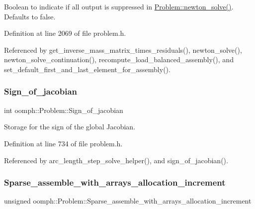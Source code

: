 Boolean to indicate if all output is suppressed in \hyperlink{classoomph_1_1Problem_a62a989ae9a9169b9d905f844db59787f}{Problem\+::newton\+\_\+solve()}. Defaults to false. 



Definition at line 2069 of file problem.\+h.



Referenced by get\+\_\+inverse\+\_\+mass\+\_\+matrix\+\_\+times\+\_\+residuals(), newton\+\_\+solve(), newton\+\_\+solve\+\_\+continuation(), recompute\+\_\+load\+\_\+balanced\+\_\+assembly(), and set\+\_\+default\+\_\+first\+\_\+and\+\_\+last\+\_\+element\+\_\+for\+\_\+assembly().

\mbox{\label{classoomph_1_1Problem_aca97d61840e46edc914e3cb4b98fd437}} 
\subsubsection{\texorpdfstring{Sign\+\_\+of\+\_\+jacobian}{Sign\_of\_jacobian}}
{\footnotesize\ttfamily int oomph\+::\+Problem\+::\+Sign\+\_\+of\+\_\+jacobian\hspace{0.3cm}{\ttfamily [protected]}}



Storage for the sign of the global Jacobian. 



Definition at line 734 of file problem.\+h.



Referenced by arc\+\_\+length\+\_\+step\+\_\+solve\+\_\+helper(), and sign\+\_\+of\+\_\+jacobian().

\mbox{\label{classoomph_1_1Problem_aeb58a3cead4d10697c4471523f705130}} 
\subsubsection{\texorpdfstring{Sparse\+\_\+assemble\+\_\+with\+\_\+arrays\+\_\+allocation\+\_\+increment}{Sparse\_assemble\_with\_arrays\_allocation\_increment}}
{\footnotesize\ttfamily unsigned oomph\+::\+Problem\+::\+Sparse\+\_\+assemble\+\_\+with\+\_\+arrays\+\_\+allocation\+\_\+increment\hspace{0.3cm}{\ttfamily [protected]}}



